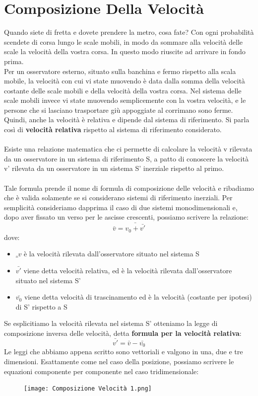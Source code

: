 \documentclass{article}
\begin{document}
\section{Composizione Della Velocità}
Quando siete di fretta e dovete prendere la metro, cosa fate? Con ogni probabilità scendete di corsa lungo le scale mobili, in modo da sommare alla velocità delle scale la velocità della vostra corsa. In questo modo riuscite ad arrivare in fondo prima.\\
Per un osservatore esterno, situato sulla banchina e fermo rispetto alla scala mobile, la velocità con cui vi state muovendo è data dalla somma della velocità costante delle scale mobili e della velocità della vostra corsa. Nel sistema delle scale mobili invece vi state muovendo semplicemente con la vostra velocità, e le persone che si lasciano trasportare giù appoggiate al corrimano sono ferme.\\
Quindi, anche la velocità è relativa e dipende dal sistema di riferimento. Si parla così di \textbf{velocità relativa} rispetto al sistema di riferimento considerato.\\\\
Esiste una relazione matematica che ci permette di calcolare la velocità v rilevata da un osservatore in un sistema di riferimento S, a patto di conoscere la velocità v' rilevata da un osservatore in un sistema S' inerziale rispetto al primo.\\\\
Tale formula prende il nome di formula di composizione delle velocità e ribadiamo che è valida solamente se si considerano sistemi di riferimento inerziali. Per semplicità consideriamo dapprima il caso di due sistemi monodimensionali e, dopo aver fissato un verso per le ascisse crescenti, possiamo scrivere la relazione:
\begin{equation}
    \bar{v}=\bar{v_{0}+\bar{v'}}
\end{equation}
dove:
\begin{itemize}
    \item $\bar_{v}$ è la velocità rilevata dall'osservatore situato nel sistema S
    \item $\bar{v'}$ viene detta velocità relativa, ed è la velocità rilevata dall'osservatore situato nel sistema S'
    \item $\bar{v_{0}}$ viene detta velocità di trascinamento ed è la velocità (costante per ipotesi) di S' rispetto a S
\end{itemize}
Se esplicitiamo la velocità rilevata nel sistema S' otteniamo la legge di composizione inversa delle velocità, detta \textbf{formula per la velocità relativa}:
\begin{equation}
    \bar{v'}=\bar{v}-\bar{v_{0}}
\end{equation}
Le leggi che abbiamo appena scritto sono vettoriali e valgono in una, due e tre dimensioni. Esattamente come nel caso della posizione, possiamo scrivere le equazioni componente per componente nel caso tridimensionale:
\begin{figure}[H]
    \centering
    \texttt{[image: Composizione Velocità 1.png]}
    \label{fig:my_label}
\end{figure}
\newpage
\end{document}
